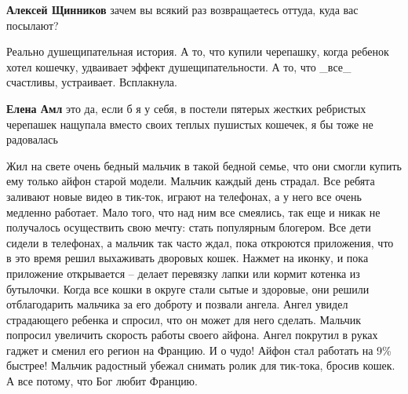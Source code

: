 \begin{itemize}
\begin{itemize}
 
\textbf{Алексей Щинников} зачем вы всякий раз возвращаетесь оттуда, куда вас посылают?
\end{itemize}

 

Реально душещипательная история. А то, что купили черепашку, когда ребенок
хотел кошечку, удваивает эффект душещипательности. А то, что \_все\_ счастливы,
устраивает. Всплакнула.

\begin{itemize}
 
\textbf{Елена Амл} это да, если б я у себя, в постели пятерых жестких ребристых черепашек нащупала вместо своих теплых пушистых кошечек, я бы тоже не радовалась
\end{itemize}

 

Жил на свете очень бедный мальчик в такой бедной семье, что они смогли купить
ему только айфон старой модели. Мальчик каждый день страдал. Все ребята
заливают новые видео в тик-ток, играют на телефонах, а у него все очень
медленно работает. Мало того, что над ним все смеялись, так еще и никак не
получалось осуществить свою мечту: стать популярным блогером. Все дети сидели в
телефонах, а мальчик так часто ждал, пока откроются приложения, что в это время
решил выхаживать дворовых кошек. Нажмет на иконку, и пока приложение
открывается – делает перевязку лапки или кормит котенка из бутылочки. Когда все
кошки в округе стали сытые и здоровые, они решили отблагодарить мальчика за его
доброту и позвали ангела. Ангел увидел страдающего ребенка и спросил, что он
может для него сделать. Мальчик попросил увеличить скорость работы своего
айфона. Ангел покрутил в руках гаджет и сменил его регион на Францию. И о чудо!
Айфон стал работать на 9\% быстрее! Мальчик радостный убежал снимать ролик для
тик-тока, бросив кошек. А все потому, что Бог любит Францию.



\end{itemize}

